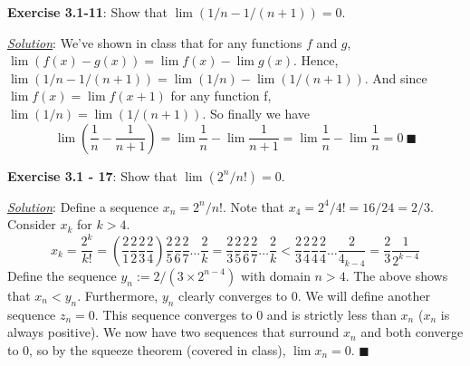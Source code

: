 \documentclass{article}
\begin{document}
\hrulefill

\textbf{Exercise 3.1-11}: Show that $\lim(1/n-1/(n+1)) = 0$.

\underline{\textit{Solution}}: We've shown in class that for any functions
$f$ and $g$, $\lim(f(x) - g(x)) = \lim f(x) - \lim g(x)$.
Hence, $\lim(1/n-1/(n+1)) = \lim (1/n) - \lim (1/(n+1))$.
And since $\lim f(x) = \lim f(x+1)$ for any
function f, $\lim(1/n) = \lim(1/(n+1))$.
So finally we have
$$\lim\left(\frac{1}{n} - \frac{1}{n+1}\right) = \lim\frac{1}{n} - \lim\frac{1}{n+1}
= \lim\frac{1}{n} - \lim\frac{1}{n} = 0\ \blacksquare$$

\hrulefill

\textbf{Exercise 3.1 - 17}: Show that $\lim(2^n / n!) = 0$.

\underline{\textit{Solution}}:
Define a sequence $x_n = 2^n/n!$. Note that $x_4 = 2^4 / 4! = 16/24 = 2/3$.
Consider $x_k$ for $k > 4$.
$$x_k = \frac{2^k}{k!}
= \left( \frac{2}{1} \frac{2}{2} \frac{2}{3} \frac{2}{4} \right)
\frac{2}{5} \frac{2}{6} \frac{2}{7} \dots \frac{2}{k}
= \frac{2}{3} \frac{2}{5} \frac{2}{6} \frac{2}{7} \dots \frac{2}{k}
< \frac{2}{3} \frac{2}{4} \frac{2}{4} \frac{2}{4} \dots \frac{2}{4_{k-4}}
= \frac{2}{3} \frac{1}{2^{k-4}}$$
Define the sequence $y_n := 2/(3\times2^{n-4})$ with domain $n > 4$.
The above shows that $x_n < y_n$. Furthermore, $y_n$ clearly converges to 0.
We will define another sequence $z_n = 0$. This sequence converges to 0 and
is strictly less than $x_n$ ($x_n$ is always positive). We now have two
sequences that surround $x_n$ and both converge to 0, so by the
squeeze theorem (covered in class), $\lim x_n = 0$. $\blacksquare$
\end{document}
